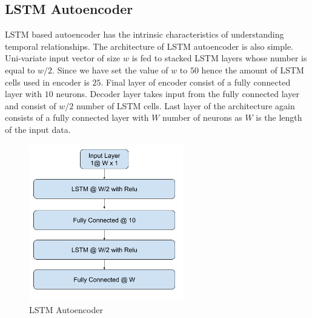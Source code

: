 \documentclass[12pt]{article}
\begin{document}
\subsection{LSTM Autoencoder }
LSTM based autoencoder has the intrinsic characteristics of understanding temporal relationships. The architecture of LSTM autoencoder is also simple. Uni-variate input vector of size $w$ is fed to stacked LSTM layers whose number is equal to $w/2$. Since we have set the value of $w$ to $50$ hence the amount of LSTM cells used in encoder is $25$. Final layer of encoder consist of a fully connected layer with $10$ neurons. Decoder layer takes input from the fully connected layer and consist of $w/2$ number of LSTM cells. Last layer of the architecture again consists of a fully connected layer with $W$ number of neurons as $W$ is the length of the input data.
\begin{figure}[H]
\center
        \includegraphics[width=0.6\textwidth]{images/architecture/LstmAutoencoder.png}
    \caption{LSTM Autoencoder}
    \label{lstmAutoencoder}
\end{figure}
\newpage
\end{document}
